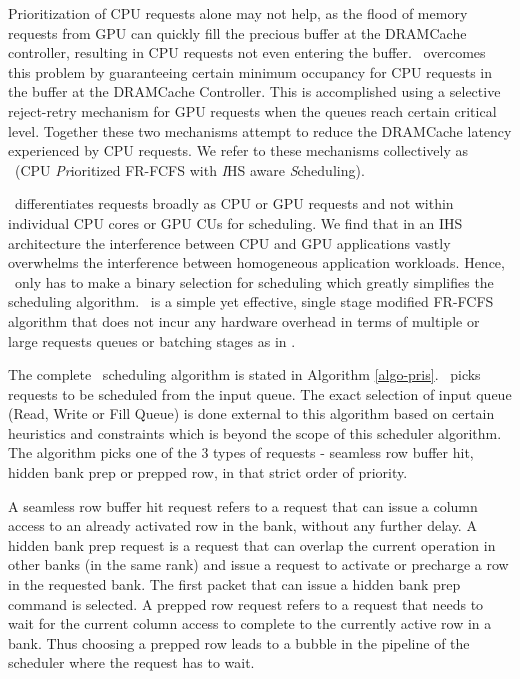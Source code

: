 \par Prioritization of CPU requests alone may not help, as the flood of memory requests from  GPU can quickly fill the precious buffer at the DRAMCache controller, resulting in CPU requests not even entering the buffer. \cachename\ overcomes this problem by guaranteeing certain minimum occupancy for CPU requests in the buffer at the DRAMCache Controller. This is accomplished using a selective reject-retry mechanism for GPU requests when the queues reach certain critical level.  Together these two mechanisms attempt to reduce the DRAMCache latency experienced by CPU requests.  We refer to these  mechanisms collectively as \prioname\ (CPU \emph{Pr}ioritized FR-FCFS with \emph{I}HS aware \emph{S}cheduling). 
\par \prioname\ differentiates requests broadly as CPU or GPU requests and not within individual CPU cores or GPU CUs for scheduling. We find that in an IHS architecture the interference between CPU and GPU applications vastly overwhelms the interference between homogeneous application workloads. Hence, \prioname\ only has to make a binary selection for scheduling which greatly simplifies the scheduling algorithm. \prioname\ is a simple yet effective, single stage modified FR-FCFS algorithm that does not incur any hardware overhead in terms of multiple or large requests queues or batching stages as in \cite{sms}.
\par The complete \prioname\ scheduling algorithm is stated in Algorithm \ref{algo-pris}. \prioname\ picks requests to be scheduled from the input queue. The exact selection of input queue (Read, Write or Fill Queue) is done external to this algorithm based on certain heuristics and constraints which is beyond the scope of this scheduler algorithm. The algorithm picks one of the 3 types of requests - seamless row buffer hit, hidden bank prep or prepped row, in that strict order of priority. 
\par A seamless row buffer hit request refers to a request that can issue a column access to an already activated row in the bank, without any further delay. A hidden bank prep request is a request that can overlap the current operation in other banks (in the same rank) and issue a request to activate or precharge a row in the requested bank. The first packet that can issue a hidden bank prep command is selected. A prepped row request refers to a request that needs to wait for the current column access to complete to the currently active row in a bank. Thus choosing a prepped row leads to a bubble in the pipeline of the scheduler where the request has to wait.
